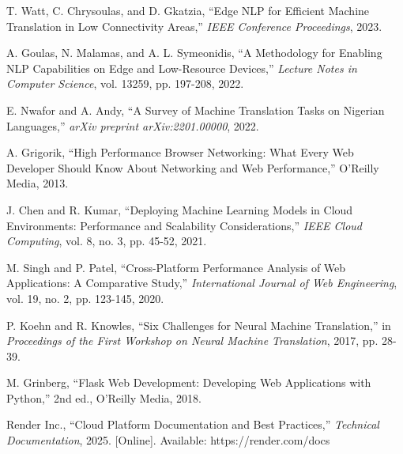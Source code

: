 \documentclass[conference]{IEEEtran}
\begin{document}
\begin{thebibliography}{9}

T. Watt, C. Chrysoulas, and D. Gkatzia, ``Edge NLP for Efficient Machine Translation in Low Connectivity Areas,'' \textit{IEEE Conference Proceedings}, 2023.

A. Goulas, N. Malamas, and A. L. Symeonidis, ``A Methodology for Enabling NLP Capabilities on Edge and Low-Resource Devices,'' \textit{Lecture Notes in Computer Science}, vol. 13259, pp. 197-208, 2022.

E. Nwafor and A. Andy, ``A Survey of Machine Translation Tasks on Nigerian Languages,'' \textit{arXiv preprint arXiv:2201.00000}, 2022.

A. Grigorik, ``High Performance Browser Networking: What Every Web Developer Should Know About Networking and Web Performance,'' O'Reilly Media, 2013.

J. Chen and R. Kumar, ``Deploying Machine Learning Models in Cloud Environments: Performance and Scalability Considerations,'' \textit{IEEE Cloud Computing}, vol. 8, no. 3, pp. 45-52, 2021.

M. Singh and P. Patel, ``Cross-Platform Performance Analysis of Web Applications: A Comparative Study,'' \textit{International Journal of Web Engineering}, vol. 19, no. 2, pp. 123-145, 2020.

P. Koehn and R. Knowles, ``Six Challenges for Neural Machine Translation,'' in \textit{Proceedings of the First Workshop on Neural Machine Translation}, 2017, pp. 28-39.

M. Grinberg, ``Flask Web Development: Developing Web Applications with Python,'' 2nd ed., O'Reilly Media, 2018.

Render Inc., ``Cloud Platform Documentation and Best Practices,'' \textit{Technical Documentation}, 2025. [Online]. Available: https://render.com/docs

\end{thebibliography}
\end{document}
